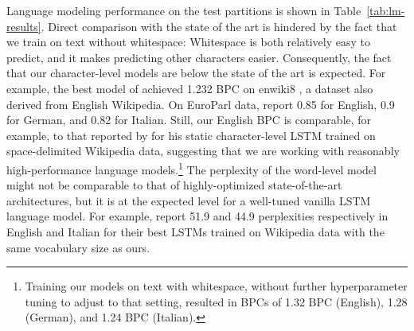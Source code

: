 Language modeling performance on the test partitions is shown in
Table~\ref{tab:lm-results}.  Direct comparison with the state of the art is hindered by
the fact that we train on text without whitespace: Whitespace is both
relatively easy to predict, and it makes predicting other
characters easier. Consequently, the fact that our character-level models are
below the state of the art is expected. For example, the best model of
 achieved 1.232 BPC on enwiki8
\cite{hutter2018}, a dataset also derived from English
Wikipedia. %
On EuroParl data,  report 0.85 for English,
0.9 for German, and 0.82 for Italian. Still, our English BPC is
comparable, for example, to that reported by  for
his static character-level LSTM trained on space-delimited Wikipedia data,
suggesting that we are working with reasonably high-performance language
models.\footnote{Training our models on text with whitespace, without further hyperparameter tuning to adjust to that setting, resulted in BPCs of 1.32 BPC (English), 1.28 (German), and 1.24 BPC (Italian).}
The perplexity of the word-level model might not be comparable to
that of highly-optimized state-of-the-art architectures, but it is at the
expected level for a well-tuned vanilla LSTM language model. For
example,  report 51.9 and 44.9 perplexities respectively in English and Italian for
their best LSTMs trained on Wikipedia data with the same vocabulary
size as ours.

